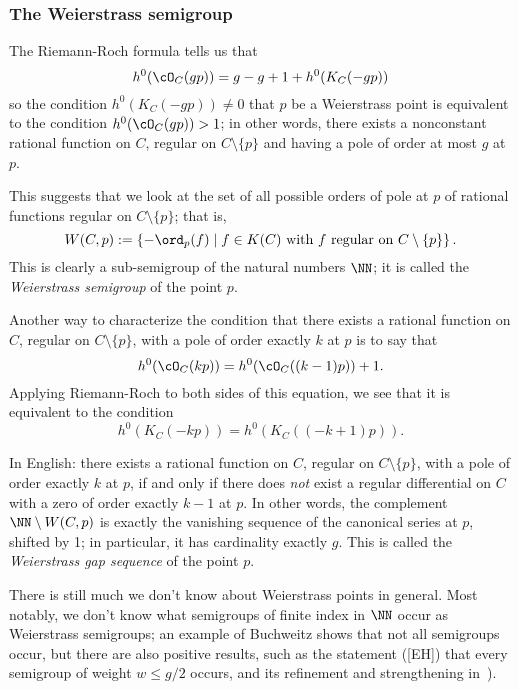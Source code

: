 \subsubsection{The Weierstrass semigroup} 

The Riemann-Roch formula tells us that
$$
h^0(\cO_C(gp)) = g - g + 1 + h^0(K_C(-gp))
$$
so the condition $h^0(K_C(-gp)) \neq 0$ that $p$ be a Weierstrass point is equivalent to the condition $h^0(\cO_C(gp)) > 1$; in other words, there exists a nonconstant rational function on $C$, regular on $C \setminus \{p\}$ and having a pole of order at most $g$ at $p$.

This suggests that we look at the set of all possible orders of pole at $p$ of rational functions regular on $C \setminus \{p\}$; that is,
$$
W(C,p) := \left\{ -\ord_p(f) \mid f \in K(C) \text{ with $f$ regular on } C \setminus \{p\} \right\}.
$$
This is clearly a sub-semigroup of the natural numbers $\NN$; it is called the \emph{Weierstrass semigroup} of the point $p$.  

Another way to characterize the condition that there exists a rational function on $C$, regular on $C \setminus \{p\}$, with a pole of order exactly $k$ at $p$ is to say that
$$
h^0(\cO_C(kp)) = h^0(\cO_C((k-1)p)) + 1.
$$
Applying Riemann-Roch to both sides of this equation, we see that it is equivalent to the condition
$$
h^0(K_C(-kp)) = h^0(K_C((-k+1)p)).
$$

In English: there exists a rational function on $C$, regular on $C \setminus \{p\}$, with a pole of order exactly $k$ at $p$, if and only if there does \emph{not} exist a regular differential on $C$ with a zero of order exactly $k-1$ at $p$.
 In other words, the complement $\NN \setminus W(C,p)$ is exactly the vanishing sequence of the canonical series at $p$, shifted by 1; in particular, it has cardinality  exactly $g$. This is called the \emph{Weierstrass gap sequence} of the point $p$.

There is still much we don't know about Weierstrass points in general. Most notably, we don't know what semigroups of finite index in $\NN$ occur as Weierstrass semigroups; an example of Buchweitz shows that not all semigroups occur, but there are also positive results, such as the statement ([EH]) that every semigroup of weight $w \leq g/2$ occurs, and its refinement and strengthening in~\cite{MR3892968}).


